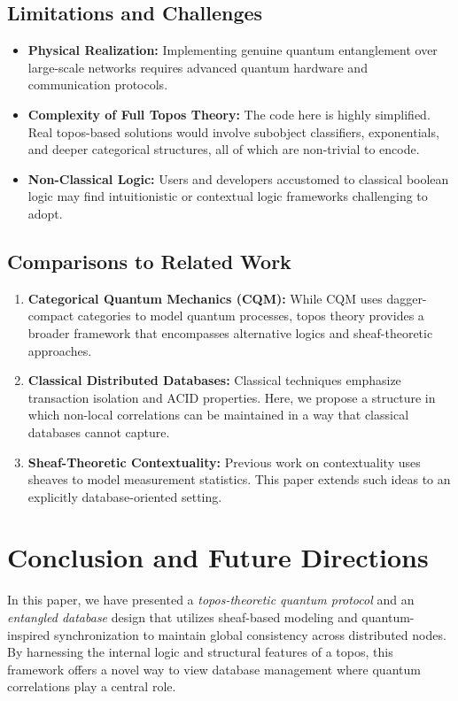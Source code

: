 \documentclass[11pt]{article}
\begin{document}
\subsection{Limitations and Challenges}
\begin{itemize}
    \item \textbf{Physical Realization:} Implementing genuine quantum entanglement over large-scale networks requires advanced quantum hardware and communication protocols.
    \item \textbf{Complexity of Full Topos Theory:} The code here is highly simplified. Real topos-based solutions would involve subobject classifiers, exponentials, and deeper categorical structures, all of which are non-trivial to encode.
    \item \textbf{Non-Classical Logic:} Users and developers accustomed to classical boolean logic may find intuitionistic or contextual logic frameworks challenging to adopt.
\end{itemize}

\subsection{Comparisons to Related Work}
\begin{enumerate}[label=(\roman*)]
    \item \textbf{Categorical Quantum Mechanics (CQM):} While CQM uses dagger-compact categories to model quantum processes, topos theory provides a broader framework that encompasses alternative logics and sheaf-theoretic approaches.
    \item \textbf{Classical Distributed Databases:} Classical techniques emphasize transaction isolation and ACID properties. Here, we propose a structure in which non-local correlations can be maintained in a way that classical databases cannot capture.
    \item \textbf{Sheaf-Theoretic Contextuality:} Previous work on contextuality uses sheaves to model measurement statistics. This paper extends such ideas to an explicitly database-oriented setting.
\end{enumerate}

\section{Conclusion and Future Directions}\label{sec:conclusion}
In this paper, we have presented a \emph{topos-theoretic quantum protocol} and an \emph{entangled database} design that utilizes sheaf-based modeling and quantum-inspired synchronization to maintain global consistency across distributed nodes. By harnessing the internal logic and structural features of a topos, this framework offers a novel way to view database management where quantum correlations play a central role.
\end{document}
